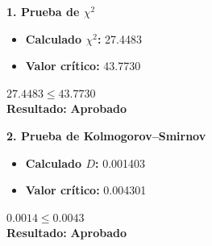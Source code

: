 \noindent
\begin{minipage}[t]{0.48\textwidth}
    \textbf{1. Prueba de \(\chi^2\)}
    \vspace{0.3cm}
    \begin{itemize}[itemsep=0.4em]
        \item \textbf{Calculado \(\chi^2\):} 27.4483
        \item \textbf{Valor crítico:} 43.7730
    \end{itemize}

    \begin{center}
        \vspace{0.5cm}
        \(27.4483 \leq 43.7730\)
        \vspace{0.1cm}
        \\\textbf{Resultado: }
        \textcolor{green!60!black}{\textbf{Aprobado}}
    \end{center}

    \vspace{0.8cm}

    \textbf{2. Prueba de Kolmogorov--Smirnov}
    \vspace{0.3cm}
    \begin{itemize}[itemsep=0.4em]
        \item \textbf{Calculado \(D\):} 0.001403
        \item \textbf{Valor crítico:} 0.004301
    \end{itemize}
    \begin{center}
        \vspace{0.5cm}
        \(0.0014 \leq 0.0043\)
        \vspace{0.1cm}
        \\\textbf{Resultado: }
        \textcolor{green!60!black}{\textbf{Aprobado}}
    \end{center}

\end{minipage}
\hfill
